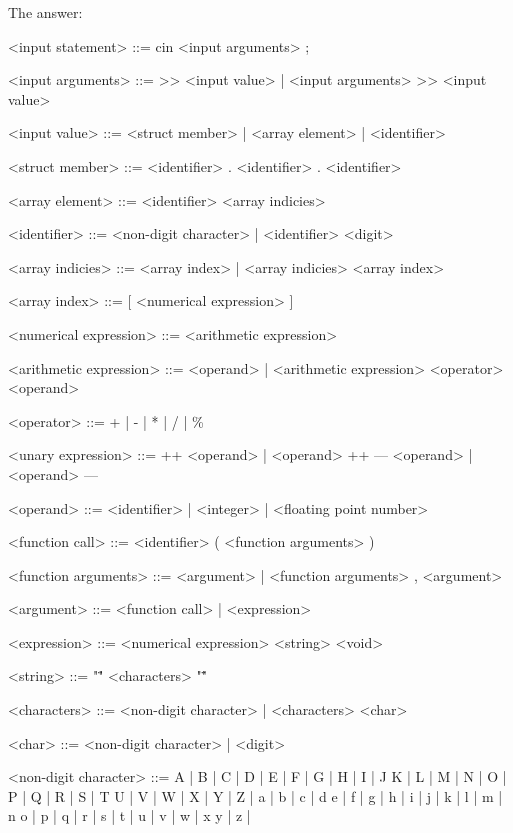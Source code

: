 \documentclass{article}
\begin{document}
		The answer:
		
	\ttfamily
	
	
	
	\begin{grammar}
	
		<input statement> ::= cin <input arguments> ;
		
		<input arguments> ::= >> <input value> | <input arguments> >> <input value>
		
		<input value> ::= <struct member> | <array element> | <identifier>
		
		<struct member> ::= <identifier> . <identifier>
					   \alt <struct member> . <identifier> 
		
		<array element> ::= <identifier> <array indicies>
		
		<identifier> ::= <non-digit character> | <identifier> <digit>
		
		<array indicies> ::= <array index> | <array indicies> <array index>
		
		<array index> ::= [ <numerical expression> ]
		
		<numerical expression> ::= <arithmetic expression>
							  \alt <unary expression>
					    	  \alt <function call>
							  					
		<arithmetic expression> ::= <operand> | <arithmetic expression> <operator> <operand>

		<operator> ::= + | - | * | / | \% 

		<unary expression> ::= ++ <operand> | <operand> ++ 
							 \alt --- <operand> | <operand> ---
									 
		<operand> ::= <identifier> | <integer> | <floating point number>
		
		<function call> ::= <identifier> ( <function arguments> )
		
		<function arguments> ::= <argument> | <function arguments> , <argument>
				
		<argument> ::= <function call> | <expression>
		
		<expression> ::= <numerical expression>
					\alt <string>
					\alt <character literal>
					\alt <void>
					
		<string> ::= "\"" <characters> "\""

		<characters> ::= <non-digit character> | <characters> <char>
		
		<char> ::= <non-digit character> | <digit>
		
		<non-digit character> ::= A | B | C | D | E | F | G | H | I | J
			  				 \alt K | L | M | N | O | P | Q | R | S | T 
			   			     \alt U | V | W | X | Y | Z | a | b | c | d 
			  				 \alt e | f | g | h | i | j | k | l | m | n
			   				 \alt o | p | q | r | s | t | u | v | w | x 
			  				 \alt y | z | 
		
		

		
		
		
	\end{grammar}
\end{document}
